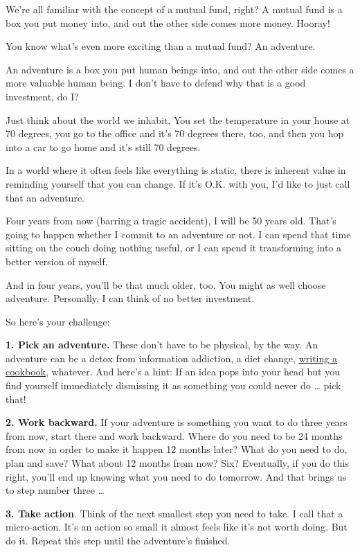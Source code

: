 We're all familiar with the concept of a mutual fund, right? A mutual
fund is a box you put money into, and out the other side comes more
money. Hooray!

You know what's even more exciting than a mutual fund? An adventure.

An adventure is a box you put human beings into, and out the other side
comes a more valuable human being. I don't have to defend why that is a
good investment, do I?

Just think about the world we inhabit. You set the temperature in your
house at 70 degrees, you go to the office and it's 70 degrees there,
too, and then you hop into a car to go home and it's still 70 degrees.

In a world where it often feels like everything is static, there is
inherent value in reminding yourself that you can change. If it's O.K.
with you, I'd like to just call that an adventure.

Four years from now (barring a tragic accident), I will be 50 years old.
That's going to happen whether I commit to an adventure or not. I can
spend that time sitting on the couch doing nothing useful, or I can
spend it transforming into a better version of myself.

And in four years, you'll be that much older, too. You might as well
choose adventure. Personally, I can think of no better investment.

So here's your challenge:

\textbf{1. Pick an adventure.} These don't have to be physical, by the
way. An adventure can be a detox from information addiction, a diet
change,
\href{https://www.nytimes3xbfgragh.onion/2017/11/21/your-money/a-story-of-a-big-dream-and-a-single-small-step.html}{writing
a cookbook}, whatever. And here's a hint: If an idea pops into your head
but you find yourself immediately dismissing it as something you could
never do \ldots{} pick that!

\textbf{2. Work backward.} If your adventure is something you want to do
three years from now, start there and work backward. Where do you need
to be 24 months from now in order to make it happen 12 months later?
What do you need to do, plan and save? What about 12 months from now?
Six? Eventually, if you do this right, you'll end up knowing what you
need to do tomorrow. And that brings us to step number three \ldots{}

\textbf{3. Take action}. Think of the next smallest step you need to
take. I call that a micro-action. It's an action so small it almost
feels like it's not worth doing. But do it. Repeat this step until the
adventure's finished.


